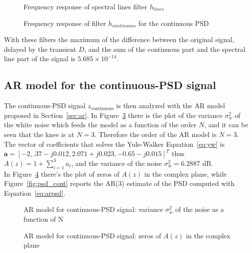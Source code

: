 \documentclass[10pt]{article}
\numberwithin{equation}{section}
\begin{document}
\begin{figure}[h!]

  \caption{Frequency response of spectral lines filter $h_{lines}$}
  \label{fig:line_filt}
\end{figure}

\begin{figure}[h!]

  \caption{Frequency response of filter $h_{continuous}$ for the continuous PSD}
  \label{fig:cont_filt}
\end{figure}


With these filters the maximum of the difference between the original signal, delayed by the transient $D$, and the sum of the continuous part and the spectral line part of the signal is $5.685 \times 10^{-14}$. \\

\subsection*{AR model for the continuous-PSD signal}
The continuous-PSD signal $z_{\text{continuous}}$ is then analyzed with the AR model proposed in Section~\ref{sec:ar}. In Figure~\ref{fig:ar_cont_sigma} there is the plot of the variance $\sigma_w^2$ of the white noise which feeds the model as a function of the order $N$, and it can be seen that the knee is at $N=3$. %
Therefore the order of the AR model is $N=3$. The vector of coefficients that solves the Yule-Walker Equation~\ref{eq:yw} is $\mathbf{a} = [-2,
.37 - j0.012, 2.071 + j0.023, -0.65 - j0.015]^T$ thus $A(z) = 1 + \sum_{i=1}^3a_i$, and the variance of the noise $\sigma_w^2 = 6.2887$ dB. \\ %
In Figure~\ref{fig:zpl_cont} there's the plot of zeros of $A(z)$ in the complex plane, while Figure~\ref{fig:psd_cont} reports the AR(3) estimate of the PSD computed with Equation~\ref{eq:arpsd}.

\begin{figure}[h!]

  \caption{AR model for continuous-PSD signal: variance $\sigma_w^2$ of the noise as a function of N}
  \label{fig:ar_cont_sigma}
\end{figure}

\begin{figure}[h!]

  \caption{AR model for continuous-PSD signal: zeros of $A(z)$ in the complex plane}
  \label{fig:zpl_cont}
\end{figure}
\end{document}
